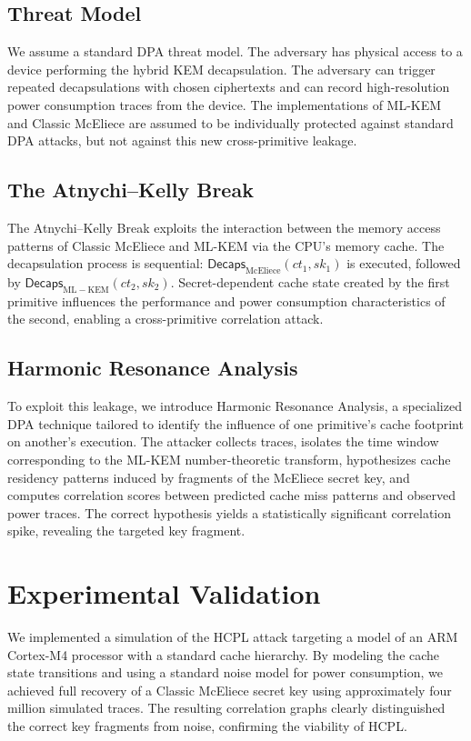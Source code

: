 \documentclass[runningheads]{llncs}
\begin{document}
\subsection{Threat Model}
We assume a standard DPA threat model. The adversary has physical access to a device performing the hybrid KEM decapsulation. The adversary can trigger repeated decapsulations with chosen ciphertexts and can record high-resolution power consumption traces from the device. The implementations of ML-KEM and Classic McEliece are assumed to be individually protected against standard DPA attacks, but not against this new cross-primitive leakage.

\subsection{The Atnychi--Kelly Break}
The Atnychi--Kelly Break exploits the interaction between the memory access patterns of Classic McEliece and ML-KEM via the CPU's memory cache. The decapsulation process is sequential: $\mathsf{Decaps}_{\mathrm{McEliece}}(ct_1, sk_1)$ is executed, followed by $\mathsf{Decaps}_{\mathrm{ML-KEM}}(ct_2, sk_2)$. Secret-dependent cache state created by the first primitive influences the performance and power consumption characteristics of the second, enabling a cross-primitive correlation attack.

\subsection{Harmonic Resonance Analysis}
To exploit this leakage, we introduce Harmonic Resonance Analysis, a specialized DPA technique tailored to identify the influence of one primitive's cache footprint on another's execution. The attacker collects traces, isolates the time window corresponding to the ML-KEM number-theoretic transform, hypothesizes cache residency patterns induced by fragments of the McEliece secret key, and computes correlation scores between predicted cache miss patterns and observed power traces. The correct hypothesis yields a statistically significant correlation spike, revealing the targeted key fragment.

\section{Experimental Validation}
We implemented a simulation of the HCPL attack targeting a model of an ARM Cortex-M4 processor with a standard cache hierarchy. By modeling the cache state transitions and using a standard noise model for power consumption, we achieved full recovery of a Classic McEliece secret key using approximately four million simulated traces. The resulting correlation graphs clearly distinguished the correct key fragments from noise, confirming the viability of HCPL.
\end{document}
